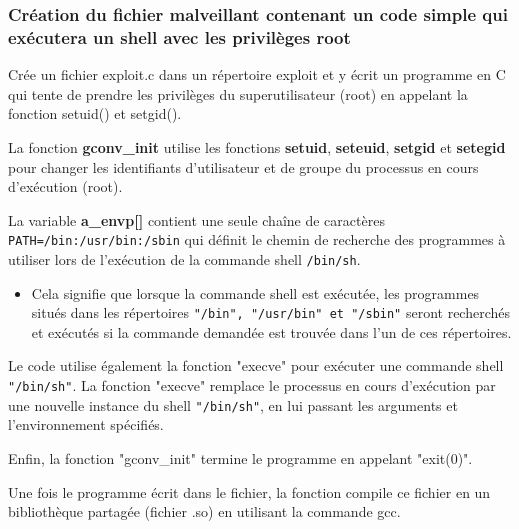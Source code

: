 \documentclass[12pt,a4paper]{article}
\newcommand{\code}[1]{\colorbox{light-gray}{\texttt{#1}}}
\begin{document}
            \subsubsection{Création du fichier malveillant contenant un code simple qui exécutera un shell avec les privilèges root}
              
            \begin{flushleft}
                \noindent Crée un fichier exploit.c dans un répertoire exploit et y écrit un programme en C qui tente de prendre les privilèges du superutilisateur (root) en appelant la fonction setuid() et setgid(). 
                
               \item La fonction \textbf{gconv\_init} utilise les fonctions \textbf{setuid}, \textbf{seteuid}, \textbf{setgid} et \textbf{setegid} pour changer les identifiants d'utilisateur et de groupe du processus en cours d'exécution (root).
               \item La variable \textbf{a\_envp[]} contient une seule chaîne de caractères \code{PATH=/bin:/usr/bin:/sbin} qui définit le chemin de recherche des programmes à utiliser lors de l'exécution de la commande shell \code{/bin/sh}. 
               \begin{itemize}
                   \item Cela signifie que lorsque la commande shell est exécutée, les programmes situés dans les répertoires \code{"/bin", "/usr/bin" et "/sbin"} seront recherchés et exécutés si la commande demandée est trouvée dans l'un de ces répertoires. 
               \end{itemize}
               
               \item Le code utilise également la fonction "execve" pour exécuter une commande shell \code{"/bin/sh"}. La fonction "execve" remplace le processus en cours d'exécution par une nouvelle instance du shell \code{"/bin/sh"}, en lui passant les arguments et l'environnement spécifiés. \item Enfin, la fonction "gconv\_init" termine le programme en appelant "exit(0)".
                \item Une fois le programme écrit dans le fichier, la fonction compile ce fichier en un bibliothèque partagée (fichier .so) en utilisant la commande gcc.
            \end{flushleft}
            
            \newpage
\end{document}
